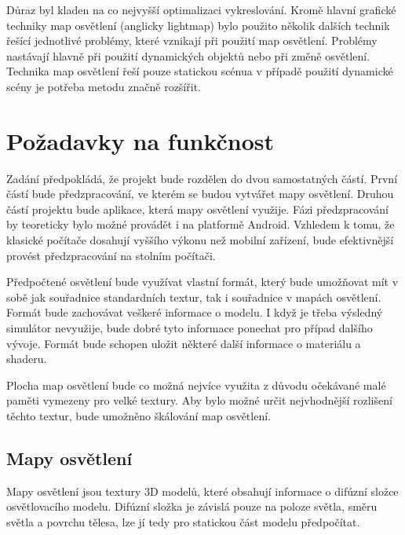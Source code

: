\documentclass[11pt,twoside,a4paper]{book}
\begin{document}
Důraz byl kladen na co nejvyšší optimalizaci vykreslování. Kromě hlavní grafické techniky map osvětlení (anglicky lightmap) bylo použito několik dalších technik řešící jednotlivé problémy, které vznikají při použití map osvětlení. Problémy nastávají hlavně při použití dynamických objektů nebo při změně osvětlení. Technika map osvětlení řeší pouze statickou scénu\linebreak a v případě použití dynamické scény je potřeba metodu značně rozšířit.

\section{Požadavky na funkčnost}
Zadání předpokládá, že projekt bude rozdělen do dvou samostatných částí. První částí bude předzpracování, ve kterém se budou vytvářet mapy osvětlení. Druhou částí projektu bude aplikace, která mapy osvětlení využije. Fázi předzpracování by teoreticky bylo možné provádět i na platformě Android. Vzhledem k tomu, že klasické počítače dosahují vyššího výkonu než mobilní zařízení, bude efektivnější provést předzpracování na stolním počítači.

Předpočtené osvětlení bude využívat vlastní formát, který bude umožňovat mít v sobě jak souřadnice standardních textur, tak i souřadnice v mapách osvětlení. Formát bude zachovávat veškeré informace o modelu. I když je třeba výsledný simulátor nevyužije, bude dobré tyto informace ponechat pro případ dalšího vývoje. Formát bude schopen uložit některé další informace o materiálu a shaderu.

Plocha map osvětlení bude co možná nejvíce využita z důvodu očekávané malé paměti vymezeny pro velké textury. Aby bylo možné určit nejvhodnější rozlišení těchto textur, bude umožněno škálování map osvětlení.
\newpage

\subsection{Mapy osvětlení}
Mapy osvětlení jsou textury 3D modelů, které obsahují informace o difúzní složce osvětlovacího modelu. Difúzní složka je závislá pouze na poloze světla, směru světla a povrchu tělesa, lze jí tedy pro statickou část modelu předpočítat.
\end{document}
